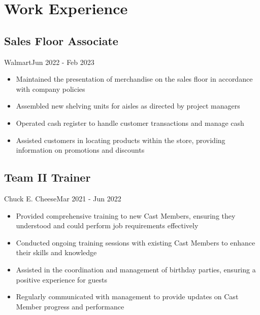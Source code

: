 \section{Work Experience}

\subsection{Sales Floor Associate}{Walmart}{Jun 2022 - Feb 2023}
\begin{itemize}
    \item Maintained the presentation of merchandise on the sales floor in accordance with company policies
    \item Assembled new shelving units for aisles as directed by project managers
    \item Operated cash register to handle customer transactions and manage cash
    \item Assisted customers in locating products within the store, providing information on promotions and discounts
\end{itemize}

\subsection{Team II Trainer}{Chuck E. Cheese}{Mar 2021 - Jun 2022}
\begin{itemize}
    \item Provided comprehensive training to new Cast Members, ensuring they understood and could perform job requirements effectively
    \item Conducted ongoing training sessions with existing Cast Members to enhance their skills and knowledge
    \item Assisted in the coordination and management of birthday parties, ensuring a positive experience for guests
    \item Regularly communicated with management to provide updates on Cast Member progress and performance
\end{itemize}

